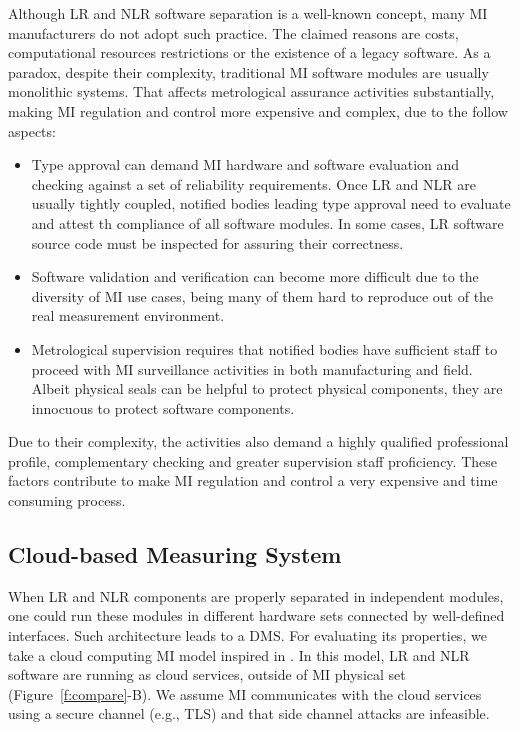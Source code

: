 \documentclass[journal]{IEEEtran}
\begin{document}
Although LR and NLR software separation is a well-known concept, many MI manufacturers do not adopt such practice. The claimed reasons are costs, computational resources restrictions or the existence of a legacy software. As a paradox, despite their complexity, traditional MI software modules are usually monolithic systems. That affects metrological assurance activities substantially, making MI regulation and control more expensive and complex, due to the follow aspects:
\begin{itemize}
\item Type approval can demand MI hardware and software evaluation and checking against a set of reliability requirements. Once LR and NLR are usually tightly coupled, notified bodies leading type approval need to evaluate and attest th compliance of all software modules. In some cases, LR software source code must be inspected for assuring their correctness.
\item Software validation and verification can become more difficult due to the diversity of MI use cases, being many of them hard to reproduce out of the real measurement environment. 
\item Metrological supervision requires that notified bodies have sufficient staff to proceed with MI surveillance activities in both manufacturing and field. Albeit physical seals can be helpful to protect physical components, they are innocuous to protect software components.
\end{itemize}

Due to their complexity, the activities also demand a highly qualified professional profile, complementary checking and greater supervision staff proficiency. These factors contribute to make MI regulation and control a very expensive and time consuming process.

\subsection{Cloud-based Measuring System}
\label{s:mi_cloud}
When LR and NLR components are properly separated in independent modules, one could run these modules in different hardware sets connected by well-defined interfaces. Such architecture leads to a DMS. For evaluating its properties, we take a cloud computing MI model inspired in \cite{Oppermann2016}. In this model, LR and NLR software are running as cloud services, outside of MI physical set (Figure~\ref{f:compare}-B). We assume MI communicates with the cloud services using a secure channel (e.g., TLS) and that side channel attacks are infeasible.
\end{document}

